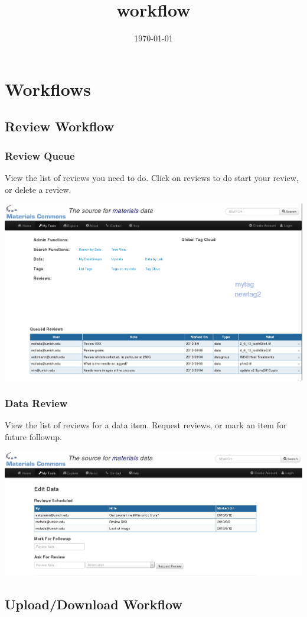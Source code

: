 \documentclass[11pt]{article}
\date{\today}
\title{workflow}
\begin{document}
\maketitle
\tableofcontents


\section{Workflows}
\label{sec-1}

\subsection{Review Workflow}
\label{sec-1-1}

\subsubsection{Review Queue}
\label{sec-1-1-1}
View the list of reviews you need to do. Click on reviews to do start your review, or delete a review.

\includegraphics[width=.9\linewidth]{ReviewQueue.png}

\subsubsection{Data Review}
\label{sec-1-1-2}
View the list of reviews for a data item. Request reviews, or mark an item for future followup.

\includegraphics[width=.9\linewidth]{DataReview.png}
\subsection{Upload/Download Workflow}
\label{sec-1-2}
\end{document}
